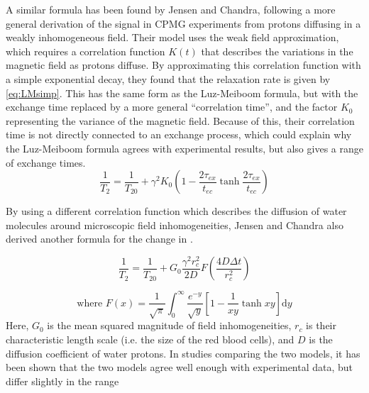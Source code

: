 A similar formula has been found by Jensen and Chandra, following a more general derivation of the signal in CPMG experiments from protons diffusing in a weakly inhomogeneous field\cite{JensenNMRrelaxationtissues2000}.
Their model uses the weak field approximation, which requires a correlation function $K(t)$ that describes the variations in the magnetic field as protons diffuse.
By approximating this correlation function with a simple exponential decay, they found that the relaxation rate is given by \autoref{eq:LMsimp}\cite{JensenNMRrelaxationtissues2000}.
This has the same form as the Luz-Meiboom formula, but with the exchange time replaced by a more general ``correlation time'', and the factor $K_0$ representing the variance of the magnetic field.
Because of this, their correlation time is not directly connected to an exchange process, which could explain why the Luz-Meiboom formula agrees with experimental results, but also gives a range of exchange times.
\begin{equation}
\label{eq:LMsimp}
\frac{1}{T_2} = \frac{1}{T_{20}} + \gamma^2 K_0 (1 - \frac{2\tau_{ex}}{t_{ec}} \tanh{\frac{2\tau_{ex}}{t_{ec}}})
\end{equation}

By using a different correlation function which describes the diffusion of water molecules around microscopic field inhomogeneities, Jensen and Chandra also derived another formula for the change in \Ttwo.

\begin{equation}
\label{eq:JC}
\frac{1}{T_2} = \frac{1}{T_{20}}+ G_0 \frac{\gamma^2 r_c^2}{2D} F(\frac{4D \Delta t}{r_c^2})
\end{equation}

\begin{displaymath}
\mbox{where  } F(x) = \frac{1}{\sqrt{\pi}} \int_0^\infty \frac{e^{-y}}{\sqrt{y}} \left[1-\frac{1}{xy} \tanh{xy}\right] \mathrm{d}y
\end{displaymath}
Here, $G_0$ is the mean squared magnitude of field inhomogeneities, $r_c$ is their characteristic length scale (i.e. the size of the red blood cells), and $D$ is the diffusion coefficient of water protons.
In studies comparing the two models, it has been shown that the two models agree well enough with experimental data, but differ slightly in the range

